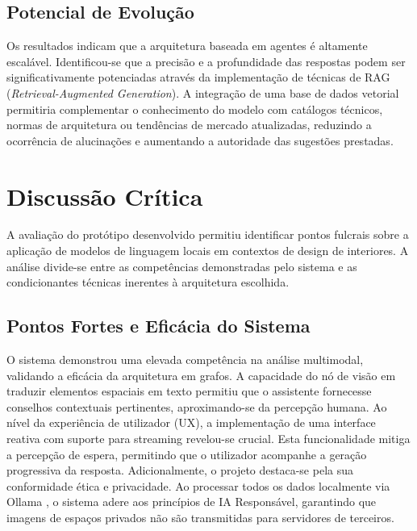 \documentclass[a4paper,12pt]{scrreprt}
\begin{document}
        \subsection{Potencial de Evolução}
        Os resultados indicam que a arquitetura baseada em agentes é altamente escalável. Identificou-se que a precisão e a profundidade das respostas podem ser significativamente potenciadas através da implementação de técnicas de RAG (\textit{Retrieval-Augmented Generation}). A integração de uma base de dados vetorial permitiria complementar o conhecimento do modelo com catálogos técnicos, normas de arquitetura ou tendências de mercado atualizadas, reduzindo a ocorrência de alucinações e aumentando a autoridade das sugestões prestadas.

    \section{Discussão Crítica}
        A avaliação do protótipo desenvolvido permitiu identificar pontos fulcrais sobre a aplicação de modelos de linguagem locais em contextos de design de interiores. A análise divide-se entre as competências demonstradas pelo sistema e as condicionantes técnicas inerentes à arquitetura escolhida.

        \subsection{Pontos Fortes e Eficácia do Sistema}
        O sistema demonstrou uma elevada competência na análise multimodal, validando a eficácia da arquitetura em grafos. A capacidade do nó de visão em traduzir elementos espaciais em texto permitiu que o assistente fornecesse conselhos contextuais pertinentes, aproximando-se da percepção humana.
        Ao nível da experiência de utilizador (UX), a implementação de uma interface reativa com suporte para streaming revelou-se crucial. Esta funcionalidade mitiga a percepção de espera, permitindo que o utilizador acompanhe a geração progressiva da resposta. Adicionalmente, o projeto destaca-se pela sua conformidade ética e privacidade. Ao processar todos os dados localmente via Ollama \cite{ollama}, o sistema adere aos princípios de IA Responsável, garantindo que imagens de espaços privados não são transmitidas para servidores de terceiros.
\end{document}
